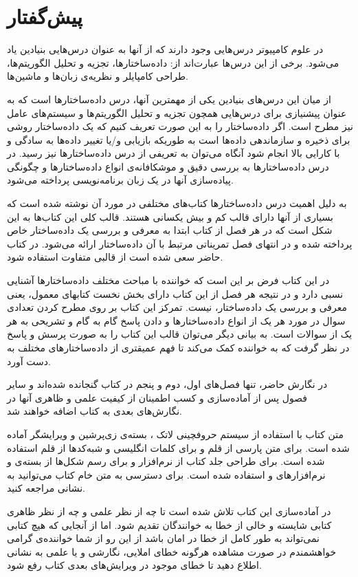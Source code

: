 \section*{پیش‌گفتار}
در علوم کامپیوتر درس‌هایی وجود دارند که از آنها به عنوان درس‌هایی بنیادین یاد می‌شود. برخی از این درس‌ها عبارت‌اند از: داده‌ساختارها، تجزیه و تحلیل الگوریتم‌ها، طراحی کامپایلر و نظریه‌ی زبان‌ها و ماشین‌ها.

از میان این درس‌های بنیادین یکی از مهمترین آنها، درس داده‌ساختارها است که به عنوان پیشنیازی برای درس‌هایی همچون تجزیه و تحلیل الگوریتم‌ها و سیستم‌های عامل نیز مطرح است. اگر داده‌ساختار را به این صورت تعریف کنیم که {\prq}یک داده‌ساختار روشی برای ذخیره و سازماندهی داده‌ها است به طوریکه بازیابی و/یا تغییر داده‌ها به سادگی و با کارایی بالا انجام شود{\plq} آنگاه می‌توان به تعریفی از درس داده‌ساختارها نیز رسید. در درس داده‌ساختارها به بررسی دقیق و موشکافانه‌ی انواع داده‌ساختارها و چگونگی پیاده‌سازی آنها در یک زبان برنامه‌نویسی پرداخته می‌شود.

به دلیل اهمیت درس داده‌ساختارها کتاب‌های مختلفی در مورد آن نوشته شده است که بسیاری از آنها دارای قالب کم و بیش یکسانی هستند. قالب کلی این کتاب‌ها به این شکل است که در هر فصل از کتاب ابتدا به معرفی و بررسی یک داده‌ساختار خاص پرداخته شده و در انتهای فصل تمریناتی مرتبط با آن داده‌ساختار ارائه می‌شود. در کتاب حاضر سعی شده است از قالبی متفاوت استفاده شود.

در این کتاب فرض بر این است که خواننده با مباحث مختلف داده‌ساختارها آشنایی نسبی دارد و در نتیجه هر فصل از این کتاب دارای بخش نخست کتابهای معمول، یعنی معرفی و بررسی یک داده‌ساختار، نیست. تمرکز این کتاب بر روی مطرح کردن تعدادی سوال در مورد هر یک از انواع داده‌ساختارها و دادن پاسخ گام به گام و تشریحی به هر یک از سوالات است. به بیانی دیگر می‌توان قالب این کتاب را به صورت پرسش و پاسخ در نظر گرفت که به خواننده کمک می‌کند تا فهم عمیقتری از داده‌ساختارهای مختلف به دست آورد.

در نگارش حاضر، تنها فصل‌های اول، دوم و پنجم در کتاب گنجانده شده‌اند و سایر فصول پس از آماده‌سازی و کسب اطمینان از کیفیت علمی و ظاهری آنها در نگارش‌های بعدی به کتاب اضافه خواهند شد.

متن کتاب با استفاده از سیستم حروفچینی لاتک ، بسته‌ی زی‌پرشین و ویرایشگر {} آماده شده است. برای متن پارسی از قلم {} و برای کلمات انگلیسی و شبه‌کدها از قلم {} استفاده شده است. برای طراحی جلد کتاب از نرم‌افزار {} و برای رسم شکل‌ها از بسته‌ی {} و نرم‌افزارهای {} و {} استفاده شده است. برای دسترسی به متن خام کتاب می‌توانید به نشانی {} مراجعه کنید.

در آماده‌سازی این کتاب تلاش شده است تا چه از نظر علمی و چه از نظر ظاهری کتابی شایسته و خالی از خطا به خوانندگان تقدیم شود. اما از آنجایی که هیچ کتابی نمی‌تواند به طور کامل از خطا در امان باشد از این رو از شما خواننده‌ی گرامی خواهشمندم در صورت مشاهده هرگونه خطای املایی، نگارشی و یا علمی به نشانی
{} اطلاع دهید تا خطای موجود در ویرایش‌های بعدی کتاب رفع شود.

\begin{flushleft}
\small
\author\\
\date
\end{flushleft}
\newpage